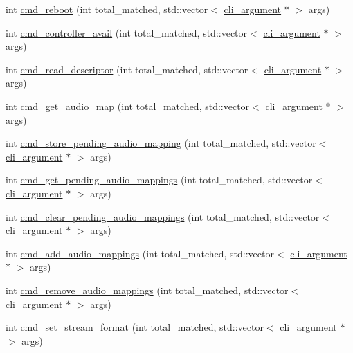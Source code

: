 \begin{DoxyCompactItemize}
int \hyperlink{classcmd__line_a507353a665b5d1b1ea291ae5dcc7f8a0}{cmd\+\_\+reboot} (int total\+\_\+matched, std\+::vector$<$ \hyperlink{classcli__argument}{cli\+\_\+argument} $\ast$ $>$ args)
\item 
int \hyperlink{classcmd__line_a4ed4eea2b99a68cc53dcc9e503ac7844}{cmd\+\_\+controller\+\_\+avail} (int total\+\_\+matched, std\+::vector$<$ \hyperlink{classcli__argument}{cli\+\_\+argument} $\ast$ $>$ args)
\item 
int \hyperlink{classcmd__line_ac12332d0c28537a20fbb567ac40e40b0}{cmd\+\_\+read\+\_\+descriptor} (int total\+\_\+matched, std\+::vector$<$ \hyperlink{classcli__argument}{cli\+\_\+argument} $\ast$ $>$ args)
\item 
int \hyperlink{classcmd__line_a60c1233984e8d4ecbde33a91f5968b20}{cmd\+\_\+get\+\_\+audio\+\_\+map} (int total\+\_\+matched, std\+::vector$<$ \hyperlink{classcli__argument}{cli\+\_\+argument} $\ast$ $>$ args)
\item 
int \hyperlink{classcmd__line_a6441ee5267b15302307a0996c251da4e}{cmd\+\_\+store\+\_\+pending\+\_\+audio\+\_\+mapping} (int total\+\_\+matched, std\+::vector$<$ \hyperlink{classcli__argument}{cli\+\_\+argument} $\ast$ $>$ args)
\item 
int \hyperlink{classcmd__line_a7e54e68c1ece07bc4c6e8da442a74289}{cmd\+\_\+get\+\_\+pending\+\_\+audio\+\_\+mappings} (int total\+\_\+matched, std\+::vector$<$ \hyperlink{classcli__argument}{cli\+\_\+argument} $\ast$ $>$ args)
\item 
int \hyperlink{classcmd__line_a356ba780e37ba6b1bba426ca001b2e40}{cmd\+\_\+clear\+\_\+pending\+\_\+audio\+\_\+mappings} (int total\+\_\+matched, std\+::vector$<$ \hyperlink{classcli__argument}{cli\+\_\+argument} $\ast$ $>$ args)
\item 
int \hyperlink{classcmd__line_aaaee251fae097155da4f2be383551c7d}{cmd\+\_\+add\+\_\+audio\+\_\+mappings} (int total\+\_\+matched, std\+::vector$<$ \hyperlink{classcli__argument}{cli\+\_\+argument} $\ast$ $>$ args)
\item 
int \hyperlink{classcmd__line_aafc563b9d7f84f46d8bc9c55d8783578}{cmd\+\_\+remove\+\_\+audio\+\_\+mappings} (int total\+\_\+matched, std\+::vector$<$ \hyperlink{classcli__argument}{cli\+\_\+argument} $\ast$ $>$ args)
\item 
int \hyperlink{classcmd__line_ac12fbbb5159e345869b53aeade846957}{cmd\+\_\+set\+\_\+stream\+\_\+format} (int total\+\_\+matched, std\+::vector$<$ \hyperlink{classcli__argument}{cli\+\_\+argument} $\ast$ $>$ args)
\item 

\end{DoxyCompactItemize}
